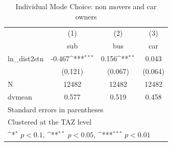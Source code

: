 \begin{table}[htbp]\centering
\def\sym#1{\ifmmode^{#1}\else\(^{#1}\)\fi}
\caption{Individual Mode Choice: non movers and car owners}
\begin{tabular}{l*{3}{c}}
\hline\hline
            &\multicolumn{1}{c}{(1)}&\multicolumn{1}{c}{(2)}&\multicolumn{1}{c}{(3)}\\
            &\multicolumn{1}{c}{sub}&\multicolumn{1}{c}{bus}&\multicolumn{1}{c}{car}\\
\hline
ln\_dist2stn & -0.467\sym{***}&  0.156\sym{**} &  0.043         \\
            &(0.121)         &(0.067)         &(0.064)         \\
\hline
N           &  12482         &  12482         &  12482         \\
dvmean      &  0.577         &  0.519         &  0.458         \\
\hline\hline
\multicolumn{4}{l}{\footnotesize Standard errors in parentheses}\\
\multicolumn{4}{l}{\footnotesize Clustered at the TAZ level}\\
\multicolumn{4}{l}{\footnotesize \sym{*} \(p<0.1\), \sym{**} \(p<0.05\), \sym{***} \(p<0.01\)}\\
\end{tabular}
\end{table}
